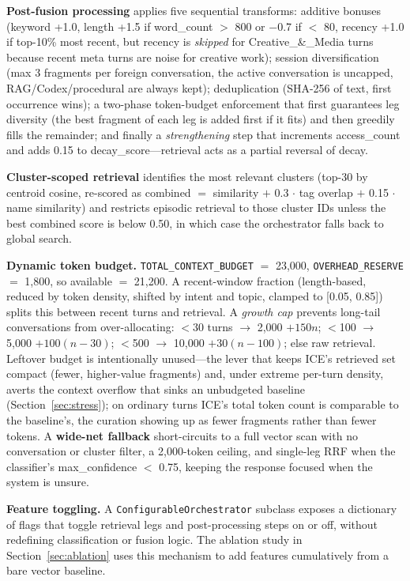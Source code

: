 \documentclass[10pt]{article}
\begin{document}
\textbf{Post-fusion processing} applies five sequential transforms: additive bonuses (keyword +1.0, length +1.5 if word\_count $>$ 800 or $-$0.7 if $<$ 80, recency +1.0 if top-10\% most recent, but recency is \emph{skipped} for Creative\_\&\_Media turns because recent meta turns are noise for creative work); session diversification (max 3 fragments per foreign conversation, the active conversation is uncapped, RAG/Codex/procedural are always kept); deduplication (SHA-256 of text, first occurrence wins); a two-phase token-budget enforcement that first guarantees leg diversity (the best fragment of each leg is added first if it fits) and then greedily fills the remainder; and finally a \emph{strengthening} step that increments access\_count and adds 0.15 to decay\_score---retrieval acts as a partial reversal of decay.

\textbf{Cluster-scoped retrieval} identifies the most relevant clusters (top-30 by centroid cosine, re-scored as combined $=$ similarity $+$ 0.3 $\cdot$ tag overlap $+$ 0.15 $\cdot$ name similarity) and restricts episodic retrieval to those cluster IDs unless the best combined score is below 0.50, in which case the orchestrator falls back to global search.

\textbf{Dynamic token budget.} \texttt{TOTAL\_CONTEXT\_BUDGET} $=$ 23{,}000, \texttt{OVERHEAD\_RESERVE} $=$ 1{,}800, so available $=$ 21{,}200. A recent-window fraction (length-based, reduced by token density, shifted by intent and topic, clamped to [0.05, 0.85]) splits this between recent turns and retrieval. A \emph{growth cap} prevents long-tail conversations from over-allocating: $<$30 turns $\to$ 2{,}000 $+ 150n$; $<$100 $\to$ 5{,}000 $+ 100(n-30)$; $<$500 $\to$ 10{,}000 $+ 30(n-100)$; else raw retrieval. Leftover budget is intentionally unused---the lever that keeps ICE's retrieved set compact (fewer, higher-value fragments) and, under extreme per-turn density, averts the context overflow that sinks an unbudgeted baseline (Section~\ref{sec:stress}); on ordinary turns ICE's total token count is comparable to the baseline's, the curation showing up as fewer fragments rather than fewer tokens. A \textbf{wide-net fallback} short-circuits to a full vector scan with no conversation or cluster filter, a 2{,}000-token ceiling, and single-leg RRF when the classifier's max\_confidence $<$ 0.75, keeping the response focused when the system is unsure.

\textbf{Feature toggling.} A \texttt{ConfigurableOrchestrator} subclass exposes a dictionary of flags that toggle retrieval legs and post-processing steps on or off, without redefining classification or fusion logic. The ablation study in Section~\ref{sec:ablation} uses this mechanism to add features cumulatively from a bare vector baseline.
\end{document}
